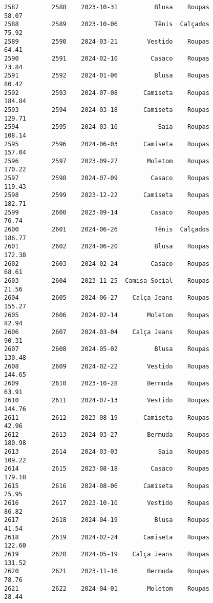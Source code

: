 \documentclass[11pt]{article}
\begin{document}
\begin{Verbatim}[commandchars=\\\{\}]
2587         2588    2023-10-31          Blusa    Roupas           58.07   
2588         2589    2023-10-06          Tênis  Calçados           75.92   
2589         2590    2024-03-21        Vestido    Roupas           64.41   
2590         2591    2024-02-10         Casaco    Roupas           73.84   
2591         2592    2024-01-06          Blusa    Roupas           80.42   
2592         2593    2024-07-08       Camiseta    Roupas          184.84   
2593         2594    2024-03-18       Camiseta    Roupas          129.71   
2594         2595    2024-03-10           Saia    Roupas          108.14   
2595         2596    2024-06-03       Camiseta    Roupas          157.04   
2596         2597    2023-09-27        Moletom    Roupas          170.22   
2597         2598    2024-07-09         Casaco    Roupas          119.43   
2598         2599    2023-12-22       Camiseta    Roupas          182.71   
2599         2600    2023-09-14         Casaco    Roupas           76.74   
2600         2601    2024-06-26          Tênis  Calçados          186.77   
2601         2602    2024-06-20          Blusa    Roupas          172.38   
2602         2603    2024-02-24         Casaco    Roupas           68.61   
2603         2604    2023-11-25  Camisa Social    Roupas           21.56   
2604         2605    2024-06-27    Calça Jeans    Roupas          155.27   
2605         2606    2024-02-14        Moletom    Roupas           82.94   
2606         2607    2024-03-04    Calça Jeans    Roupas           90.31   
2607         2608    2024-05-02          Blusa    Roupas          130.48   
2608         2609    2024-02-22        Vestido    Roupas          144.65   
2609         2610    2023-10-28        Bermuda    Roupas           63.91   
2610         2611    2024-07-13        Vestido    Roupas          144.76   
2611         2612    2023-08-19       Camiseta    Roupas           42.96   
2612         2613    2024-03-27        Bermuda    Roupas          180.98   
2613         2614    2024-03-03           Saia    Roupas          109.22   
2614         2615    2023-08-18         Casaco    Roupas          179.18   
2615         2616    2024-08-06       Camiseta    Roupas           25.95   
2616         2617    2023-10-10        Vestido    Roupas           86.82   
2617         2618    2024-04-19          Blusa    Roupas           41.54   
2618         2619    2024-02-24       Camiseta    Roupas          122.60   
2619         2620    2024-05-19    Calça Jeans    Roupas          131.52   
2620         2621    2023-11-16        Bermuda    Roupas           78.76   
2621         2622    2024-04-01        Moletom    Roupas           28.44   

\end{Verbatim}
\end{document}
